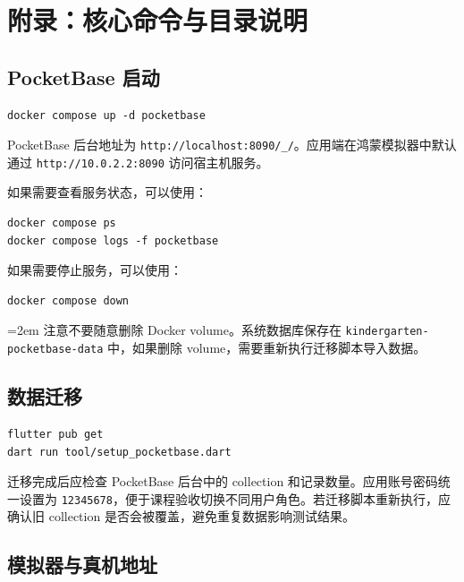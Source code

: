 
\chapter{附录：核心命令与目录说明}

\section{PocketBase 启动}

\begin{lstlisting}[style=codexcode]
docker compose up -d pocketbase
\end{lstlisting}

PocketBase 后台地址为 \texttt{http://localhost:8090/\_/}。应用端在鸿蒙模拟器中默认通过 \texttt{http://10.0.2.2:8090} 访问宿主机服务。

如果需要查看服务状态，可以使用：

\begin{lstlisting}[style=codexcode]
docker compose ps
docker compose logs -f pocketbase
\end{lstlisting}

如果需要停止服务，可以使用：

\begin{lstlisting}[style=codexcode]
docker compose down
\end{lstlisting}

{\RaggedRight{}\emergencystretch=2em 注意不要随意删除 Docker volume。系统数据库保存在\hspace{0pt} \texttt{kindergarten-pocketbase-data}\hspace{0pt} 中，如果删除 volume，需要重新执行迁移脚本导入数据。\par}

\section{数据迁移}

\begin{lstlisting}[style=codexcode]
flutter pub get
dart run tool/setup_pocketbase.dart
\end{lstlisting}

迁移完成后应检查 PocketBase 后台中的 collection 和记录数量。应用账号密码统一设置为 \texttt{12345678}，便于课程验收切换不同用户角色。若迁移脚本重新执行，应确认旧 collection 是否会被覆盖，避免重复数据影响测试结果。

\section{模拟器与真机地址}

